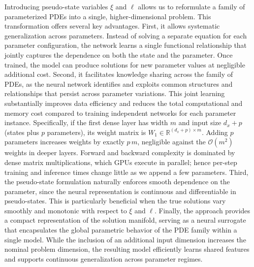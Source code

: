 \documentclass[12pt]{article}
\newcommand{\jh}[1]{\textcolor{purple}{\textsf{[JH: #1]}}}
\begin{document}

Introducing pseudo-state variables $\xi$ and $\ell$ allows us to reformulate a family of parameterized PDEs into a single, higher-dimensional problem. This transformation offers several key advantages. First, it allows systematic generalization across parameters. Instead of solving a separate equation for each parameter configuration, the network learns a single functional relationship that jointly captures the dependence on both the state and the parameter. Once trained, the model can produce solutions for new parameter values at negligible additional cost. Second, it facilitates knowledge sharing across the family of PDEs, as the neural network identifies and exploits common structures and relationships that persist across parameter variations. This joint learning substantially improves data efficiency and reduces the total computational and memory cost compared to training independent networks for each parameter instance. Specifically, if the first dense layer has width \(m\) and input size \(d_x+p\) (states plus \(p\) parameters), its weight matrix is \(W_1\in\mathbb{R}^{(d_x+p)\times m}\). Adding \(p\) parameters increases weights by exactly \(p\,m\), negligible against the \(\mathcal{O}(m^2)\) weights in deeper layers. Forward and backward complexity is dominated by dense matrix multiplications, which GPUs execute in parallel; hence per-step training and inference times change little as we append a few parameters. Third, the pseudo-state formulation naturally enforces smooth dependence on the parameter, since the neural representation is continuous and differentiable in pseudo-states. This is particularly beneficial when the true solutions vary smoothly and monotonic with respect to $\xi$ and $\ell$. Finally, the approach provides a compact representation of the solution manifold, serving as a neural surrogate that encapsulates the global parametric behavior of the PDE family within a single model. While the inclusion of an additional input dimension increases the nominal problem dimension, the resulting model efficiently learns shared features and supports continuous generalization across parameter regimes.
\end{document}
